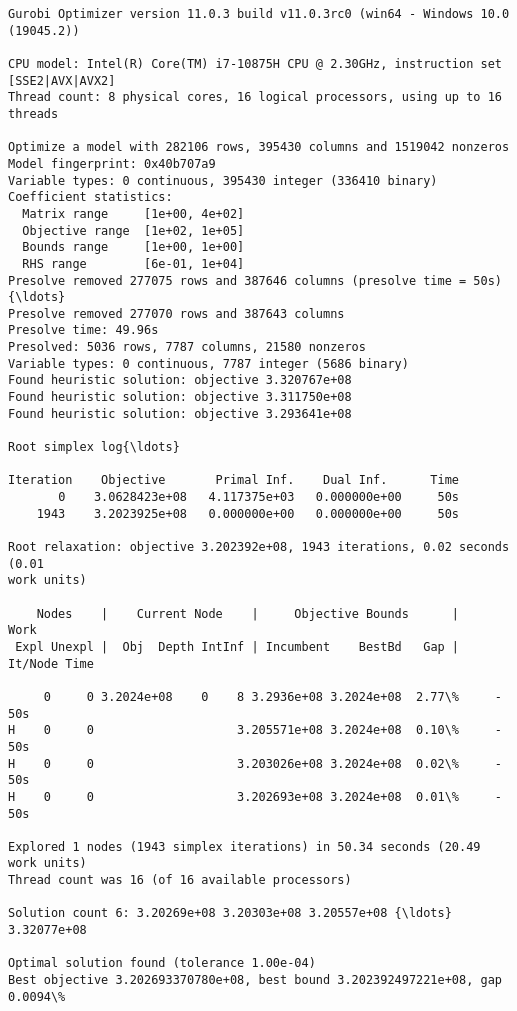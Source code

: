 \documentclass[11pt]{article}
\begin{document}
    \begin{Verbatim}[commandchars=\\\{\}]
Gurobi Optimizer version 11.0.3 build v11.0.3rc0 (win64 - Windows 10.0
(19045.2))

CPU model: Intel(R) Core(TM) i7-10875H CPU @ 2.30GHz, instruction set
[SSE2|AVX|AVX2]
Thread count: 8 physical cores, 16 logical processors, using up to 16 threads

Optimize a model with 282106 rows, 395430 columns and 1519042 nonzeros
Model fingerprint: 0x40b707a9
Variable types: 0 continuous, 395430 integer (336410 binary)
Coefficient statistics:
  Matrix range     [1e+00, 4e+02]
  Objective range  [1e+02, 1e+05]
  Bounds range     [1e+00, 1e+00]
  RHS range        [6e-01, 1e+04]
Presolve removed 277075 rows and 387646 columns (presolve time = 50s) {\ldots}
Presolve removed 277070 rows and 387643 columns
Presolve time: 49.96s
Presolved: 5036 rows, 7787 columns, 21580 nonzeros
Variable types: 0 continuous, 7787 integer (5686 binary)
Found heuristic solution: objective 3.320767e+08
Found heuristic solution: objective 3.311750e+08
Found heuristic solution: objective 3.293641e+08

Root simplex log{\ldots}

Iteration    Objective       Primal Inf.    Dual Inf.      Time
       0    3.0628423e+08   4.117375e+03   0.000000e+00     50s
    1943    3.2023925e+08   0.000000e+00   0.000000e+00     50s

Root relaxation: objective 3.202392e+08, 1943 iterations, 0.02 seconds (0.01
work units)

    Nodes    |    Current Node    |     Objective Bounds      |     Work
 Expl Unexpl |  Obj  Depth IntInf | Incumbent    BestBd   Gap | It/Node Time

     0     0 3.2024e+08    0    8 3.2936e+08 3.2024e+08  2.77\%     -   50s
H    0     0                    3.205571e+08 3.2024e+08  0.10\%     -   50s
H    0     0                    3.203026e+08 3.2024e+08  0.02\%     -   50s
H    0     0                    3.202693e+08 3.2024e+08  0.01\%     -   50s

Explored 1 nodes (1943 simplex iterations) in 50.34 seconds (20.49 work units)
Thread count was 16 (of 16 available processors)

Solution count 6: 3.20269e+08 3.20303e+08 3.20557e+08 {\ldots} 3.32077e+08

Optimal solution found (tolerance 1.00e-04)
Best objective 3.202693370780e+08, best bound 3.202392497221e+08, gap 0.0094\%
    \end{Verbatim}
\end{document}
